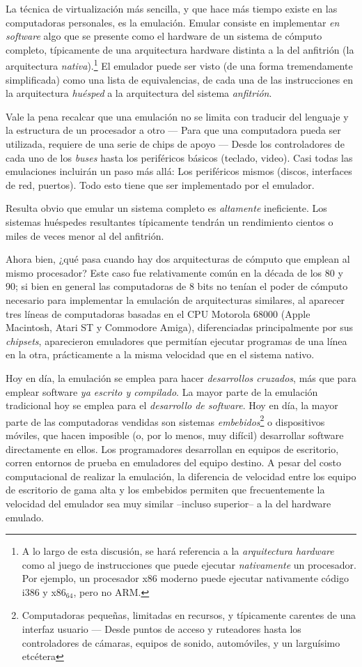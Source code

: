 \documentclass[11pt,fleqn]{book} %
\begin{document}
La técnica de virtualización más sencilla, y que hace más tiempo
existe en las computadoras personales, es la emulación. Emular
consiste en implementar \emph{en software} algo que se presente como el
hardware de un sistema de cómputo completo, típicamente de una arquitectura hardware
distinta a la del anfitrión (la arquitectura \emph{nativa}).\footnote{A lo largo de esta discusión, se hará
referencia a la \emph{arquitectura hardware} como al juego de
instrucciones que puede ejecutar \emph{nativamente} un procesador. Por
ejemplo, un procesador x86 moderno puede ejecutar nativamente código
i386 y x86$_{\mathrm{64}}$, pero no ARM. } El emulador puede ser visto (de una forma
tremendamente simplificada) como una lista de equivalencias, de cada
una de las instrucciones en la arquitectura \emph{huésped} a la
arquitectura del sistema \emph{anfitrión}.

Vale la pena recalcar que una emulación no se limita con traducir del
lenguaje y la estructura de un procesador a otro — Para que una
computadora pueda ser utilizada, requiere de una serie de chips de
apoyo — Desde los controladores de cada uno de los \emph{buses} hasta los
periféricos básicos (teclado, video). Casi todas las emulaciones
incluirán un paso más allá: Los periféricos mismos (discos, interfaces
de red, puertos). Todo esto tiene que ser implementado por el
emulador.

Resulta obvio que emular un sistema completo es \emph{altamente}
ineficiente. Los sistemas huéspedes resultantes típicamente tendrán un
rendimiento cientos o miles de veces menor al del anfitrión.

Ahora bien, ¿qué pasa cuando hay dos arquitecturas de cómputo que
emplean al mismo procesador? Este caso fue relativamente común en la
década de los 80 y 90; si bien en general las computadoras de 8 bits no tenían
el poder de cómputo necesario para implementar la emulación de
arquitecturas similares, al aparecer tres líneas de computadoras
basadas en el CPU Motorola 68000 (Apple Macintosh, Atari ST y
Commodore Amiga), diferenciadas principalmente por sus \emph{chipsets},
aparecieron emuladores que permitían ejecutar programas de una línea
en la otra, prácticamente a la misma velocidad que en el sistema nativo.

Hoy en día, la emulación se emplea para hacer \emph{desarrollos cruzados},
más que para emplear software \emph{ya escrito y compilado}.  La mayor
parte de la emulación tradicional hoy se emplea para el \emph{desarrollo de software}. Hoy en día, la mayor parte de las computadoras vendidas son
sistemas \emph{embebidos}\footnote{Computadoras pequeñas, limitadas en
recursos, y típicamente carentes de una interfaz usuario — Desde
puntos de acceso y ruteadores hasta los controladores de cámaras,
equipos de sonido, automóviles, y un larguísimo etcétera } o
dispositivos móviles, que hacen imposible (o, por lo menos, muy
difícil) desarrollar software directamente en ellos. Los programadores
desarrollan en equipos de escritorio, corren entornos de prueba en
emuladores del equipo destino. A pesar del costo computacional de
realizar la emulación, la diferencia de velocidad entre los equipo de
escritorio de gama alta y los embebidos permiten que frecuentemente la
velocidad del emulador sea muy similar –incluso superior– a la del
hardware emulado.
\end{document}
